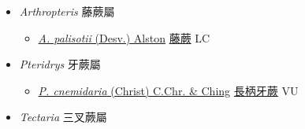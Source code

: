 
  \begin{itemize}
 \item[] \textit{Arthropteris} 藤蕨屬
                    
  \begin{itemize}
        \item[] \href{http://www.theplantlist.org/tpl1.1/search?q=Arthropteris+palisotii}{\textit{A. palisotii} (Desv.) Alston}   \href{\detokenize{http://taibnet.sinica.edu.tw/chi/taibnet_species_list.php?T2=藤蕨&T2_new_value=true&fr=y}}{藤蕨} LC
  \end{itemize}
 \item[] \textit{Pteridrys} 牙蕨屬
                    
  \begin{itemize}
        \item[] \href{http://www.theplantlist.org/tpl1.1/search?q=Pteridrys+cnemidaria}{\textit{P. cnemidaria} (Christ) C.Chr. \& Ching}   \href{\detokenize{http://taibnet.sinica.edu.tw/chi/taibnet_species_list.php?T2=長柄牙蕨&T2_new_value=true&fr=y}}{長柄牙蕨} VU
  \end{itemize}
 \item[] \textit{Tectaria} 三叉蕨屬
                    

\end{itemize}
